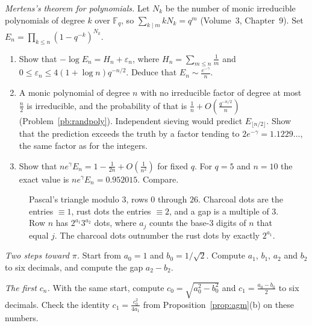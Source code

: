 \begin{exercise}[$\star\star$]\label{pb:polymertens}
\emph{Mertens's theorem for polynomials.} Let $N_k$ be the number of monic irreducible polynomials of degree $k$ over $\mathbb F_q$, so $\sum_{k\mid m}kN_k=q^m$ (Volume~3, Chapter~9). Set $E_n=\prod_{k\le n}(1-q^{-k})^{N_k}$.
\begin{enumerate}[label=(\alph*)]
\item Show that $-\log E_n=H_n+\varepsilon_n$, where $H_n=\sum_{m\le n}\frac1m$ and $0\le\varepsilon_n\le4(1+\log n)q^{-n/2}$. Deduce that $E_n\sim\frac{e^{-\gamma}}n$.
\item A monic polynomial of degree $n$ with no irreducible factor of degree at most $\frac n2$ is irreducible, and the probability of that is $\frac1n+O(\frac{q^{-n/2}}n)$
(Problem~\ref{pb:randpoly}). Independent sieving would predict $E_{\lfloor n/2\rfloor}$. Show that the prediction exceeds the truth by a factor tending to $2e^{-\gamma}=1.1229\ldots$, the same factor as for the integers.
\item Show that $ne^\gamma E_n=1-\frac1{2n}+O(\frac1{n^2})$ for fixed $q$. For $q=5$ and $n=10$ the exact value is $ne^\gamma E_n=0.952015$. Compare.
\end{enumerate}
\end{exercise}

\begin{figure}[ht]
\centering
{}
\caption{Pascal's triangle modulo $3$, rows $0$ through $26$. Charcoal dots are the entries $\equiv1$, rust dots the entries $\equiv2$, and a gap
is a multiple of $3$. Row $n$ has $2^{a_1}3^{a_2}$ dots, where $a_j$ counts the base-$3$ digits of $n$ that equal $j$. The charcoal dots
outnumber the rust dots by exactly $2^{a_1}$.}
\label{fig:pascal3}
\end{figure}

\begin{exercise}[$\star$]\label{ex:rw13a}
\emph{Two steps toward $\pi$.} Start from $a_0=1$ and $b_0=1/\sqrt2$. Compute $a_1$, $b_1$, $a_2$ and $b_2$ to six decimals, and compute the gap $a_2-b_2$.
\end{exercise}

\begin{exercise}[$\star\star$]\label{ex:rw13b}
\emph{The first $c_n$.} With the same start, compute $c_0=\sqrt{a_0^2-b_0^2}$ and $c_1=\frac{a_0-b_0}2$ to six decimals. Check the identity $c_1=\frac{c_0^2}{4a_1}$ from Proposition~\ref{prop:agm}(b) on these numbers.
\end{exercise}

